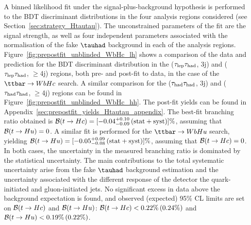A binned likelihood fit under the signal-plus-background hypothesis is performed to the BDT discriminant distributions in the four 
analysis regions considered (see Section~\ref{sec:strategy_Htautau}). The unconstrained parameters of the fit are the signal 
strength, as well as four independent parameters associated with the normalisation of the fake $\tauhad$ background in each of the analysis regions. 
Figure~\ref{fig:prepostfit_unblinded_WbHc_lh} shows a comparison of the data and prediction for the BDT discriminant distribution in
the ($\tau_{\mathrm{lep}} \tau_{\mathrm{had}}$, 3j) and ($\tau_{\mathrm{lep}} \tau_{\mathrm{had}}$, $\geq$4j) regions, both pre- and post-fit to data, in the case of the $\Hc$ search.  
A similar comparison for the ($\tau_{\mathrm{had}} \tau_{\mathrm{had}}$, 3j) and ($\tau_{\mathrm{had}} \tau_{\mathrm{had}}$, $\geq$4j) regions can be found in Figure~\ref{fig:prepostfit_unblinded_WbHc_hh}.
The post-fit yields can be found in Appendix~\ref{sec:prepostfit_yields_Htautau_appendix}.
The best-fit branching ratio obtained is $\mathcal{B}(t\to Hc)=[-0.04^{+0.10}_{-0.09}\,(\mathrm{stat+syst})]\%$, assuming that $\mathcal{B}(t\to Hu)=0$. 
A similar fit is performed for the $\Hu$ search, yielding $\mathcal{B}(t\to Hu)=[-0.05^{+0.09}_{-0.08}\,(\mathrm{stat+syst})]\%$,
assuming that $\mathcal{B}(t\to Hc)=0$. In both cases, the uncertainty in the measured branching ratio is dominated by the statistical uncertainty.
The main contributions to the total systematic uncertainty arise from the fake $\tauhad$ background estimation and the uncertainty associated
with the different response of the detector the quark-initiated and gluon-initiated jets.
No significant excess in data above the background expectation is found, 
and observed (expected) 95\% CL limits are set on $\mathcal{B}(t\to Hc)$ and $\mathcal{B}(t\to Hu)$:
$\mathcal{B}(t\to Hc)<0.22\%\,(0.24\%)$ and $\mathcal{B}(t\to Hu)<0.19\%\,(0.22\%)$.

